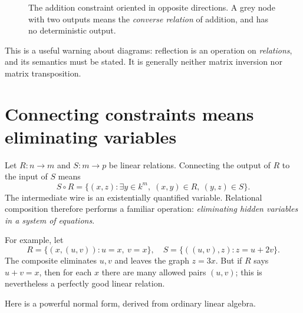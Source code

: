 \begin{figure}[H]
\centering
{}
\caption{The addition constraint oriented in opposite directions. A grey node with two outputs means the \emph{converse relation} of addition, and has no deterministic output.}
\end{figure}

This is a useful warning about diagrams: reflection is an operation on \emph{relations}, and its semantics must be stated. It is generally neither matrix inversion nor matrix transposition.

\section{Connecting constraints means eliminating variables}

Let \(R:n\to m\) and \(S:m\to p\) be linear relations. Connecting the output of \(R\) to the input of \(S\) means
\[
 \boxed{
 S\circ R=\{(x,z):\exists y\in k^m,\;
             (x,y)\in R,\ (y,z)\in S\}.
 }
\]
The intermediate wire is an existentially quantified variable. Relational composition therefore performs a familiar operation: \emph{eliminating hidden variables in a system of equations}.

For example, let
\[
 R=\{(x,(u,v)):u=x,\ v=x\},
 \quad
 S=\{((u,v),z):z=u+2v\}.
\]
The composite eliminates \(u,v\) and leaves the graph \(z=3x\). But if \(R\) says \(u+v=x\), then for each \(x\) there are many allowed pairs \((u,v)\); this is nevertheless a perfectly good linear relation.

Here is a powerful normal form, derived from ordinary linear algebra.

